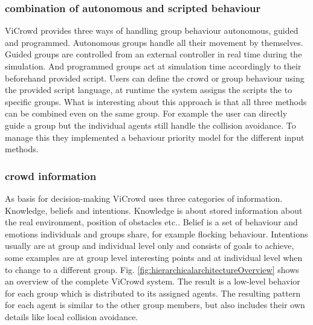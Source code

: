 \documentclass[sigconf]{acmart}
\begin{document}
\subsubsection{combination of autonomous and scripted behaviour}
ViCrowd provides three ways of handling group behaviour autonomous, guided and programmed. 
Autonomous groups handle all their movement by themselves. Guided groups are controlled from an external controller in real time during the simulation. And programmed groups act at simulation time accordingly to their beforehand provided script. Users can define the crowd or group behaviour using the provided script language, at runtime the system assigns the scripts the to specific groups. 
What is interesting about this approach is that all three methods can be combined even on the same group. For example the user can directly guide a group but the individual agents still handle the collision avoidance. To manage this they implemented a behaviour priority model for the different input methods.
\subsubsection{crowd information}
As basis for decision-making ViCrowd uses three categories of information. Knowledge, beliefs and intentions. 
Knowledge is about stored information about the real environment, position of obstacles etc.. 
Belief is a set of behaviour and emotions individuals and groups share, for example flocking behaviour.
Intentions usually are at group and individual level only and consists of goals to achieve, some examples are at group level interesting points and at individual level when to change to a different group.
Fig. \ref{fig:hierarchicalarchitectureOverview} shows an overview of the complete ViCrowd system. The result is a low-level behavior for each group which is distributed to its assigned agents. The resulting pattern for each agent is similar to the other group members, but also includes their own details like local collision avoidance.
\end{document}
